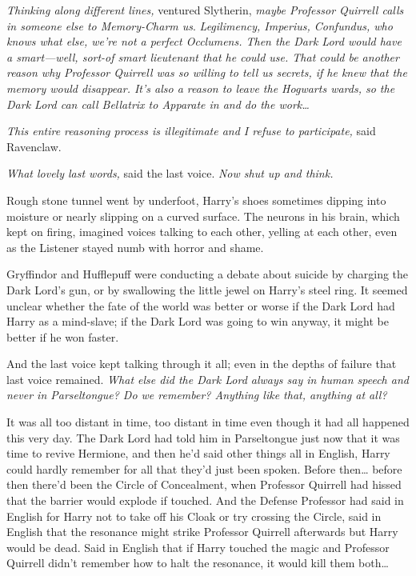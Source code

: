 \emph{Thinking along different lines,} ventured Slytherin, \emph{maybe
Professor Quirrell calls in someone else to Memory-Charm us}.
\emph{Legilimency, Imperius, Confundus, who knows what else, we're not a
perfect Occlumens. Then the Dark Lord would have a smart---well, sort-of smart
lieutenant that he could use. That could be another reason why Professor
Quirrell was so willing to tell us secrets, if he knew that the memory would
disappear. It's also a reason to leave the Hogwarts wards, so the Dark Lord can
call Bellatrix to Apparate in and do the work{\ldots}}

\emph{This entire reasoning process is illegitimate and I refuse to
participate,} said Ravenclaw.

\emph{What lovely last words,} said the last voice. \emph{Now shut up and
think.}

Rough stone tunnel went by underfoot, Harry's shoes sometimes dipping into
moisture or nearly slipping on a curved surface. The neurons in his brain,
which kept on firing, imagined voices talking to each other, yelling at each
other, even as the Listener stayed numb with horror and shame.

Gryffindor and Hufflepuff were conducting a debate about suicide by charging
the Dark Lord's gun, or by swallowing the little jewel on Harry's steel ring.
It seemed unclear whether the fate of the world was better or worse if the Dark
Lord had Harry as a mind-slave; if the Dark Lord was going to win anyway, it
might be better if he won faster.

And the last voice kept talking through it all; even in the depths of failure
that last voice remained. \emph{What else did the Dark Lord always say in human
speech and never in Parseltongue? Do we remember? Anything like that, anything
at all?}

It was all too distant in time, too distant in time even though it had all
happened this very day. The Dark Lord had told him in Parseltongue just now
that it was time to revive Hermione, and then he'd said other things all in
English, Harry could hardly remember for all that they'd just been spoken.
Before then{\ldots} before then there'd been the Circle of Concealment, when
Professor Quirrell had hissed that the barrier would explode if touched. And
the Defense Professor had said in English for Harry not to take off his Cloak
or try crossing the Circle, said in English that the resonance might strike
Professor Quirrell afterwards but Harry would be dead. Said in English that if
Harry touched the magic and Professor Quirrell didn't remember how to halt the
resonance, it would kill them both{\ldots}

